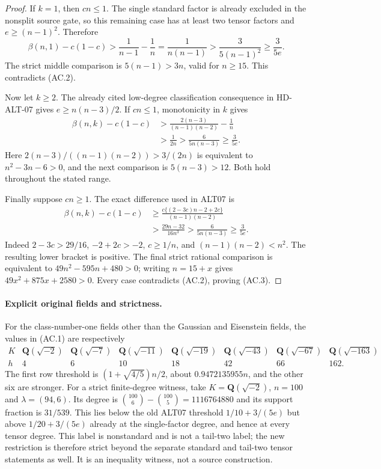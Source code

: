 \begin{proof}
If $k=1$, then $cn\le1$. The single standard factor is already
excluded in the nonsplit source gate, so this remaining case has
at least two tensor factors and $e\ge(n-1)^2$. Therefore
\[
 \beta(n,1)-c(1-c)
 >\frac1{n-1}-\frac1n
 =\frac1{n(n-1)}
 >\frac3{5(n-1)^2}\ge\frac3{5e}.
 \tag{AC.6}
\]
The strict middle comparison is $5(n-1)>3n$, valid for $n\ge15$.
This contradicts (AC.2).

Now let $k\ge2$. The already cited low-degree classification
consequence in HD-ALT-07 gives $e\ge n(n-3)/2$.
If $cn\le1$, monotonicity in $k$ gives
\[
 \begin{split}
 \beta(n,k)-c(1-c)
 &>\frac{2(n-3)}{(n-1)(n-2)}-\frac1n\\
 &>\frac1{2n}>\frac6{5n(n-3)}\ge\frac3{5e}.
 \end{split}
 \tag{AC.7}
\]
Here $2(n-3)/((n-1)(n-2))>3/(2n)$ is equivalent to
$n^2-3n-6>0$, and the next comparison is $5(n-3)>12$.
Both hold throughout the stated range.

Finally suppose $cn\ge1$. The exact difference used in ALT07 is
\[
 \begin{split}
 \beta(n,k)-c(1-c)
 &\ge\frac{c\{(2-3c)n-2+2c\}}{(n-1)(n-2)}\\
 &>\frac{29n-32}{16n^3}
 >\frac6{5n(n-3)}\ge\frac3{5e}.
 \end{split}
 \tag{AC.8}
\]
Indeed $2-3c>29/16$, $-2+2c>-2$, $c\ge1/n$,
and $(n-1)(n-2)<n^2$. The resulting lower bracket is positive.
The final strict rational comparison is equivalent to
$49n^2-595n+480>0$; writing $n=15+x$ gives
$49x^2+875x+2580>0$. Every case contradicts (AC.2), proving (AC.3).
\end{proof}

\paragraph{Explicit original fields and strictness.}
For the class-number-one fields other than the Gaussian and Eisenstein
fields, the values in (AC.1) are respectively
\[
\begin{array}{c|rrrrrrr}
K&\mathbf Q(\sqrt{-2})&\mathbf Q(\sqrt{-7})&
\mathbf Q(\sqrt{-11})&\mathbf Q(\sqrt{-19})&
\mathbf Q(\sqrt{-43})&\mathbf Q(\sqrt{-67})&
\mathbf Q(\sqrt{-163})\\\hline
h&4&6&10&18&42&66&162.
\end{array}
 \tag{AC.9}
\]
The first row threshold is $(1+\sqrt{4/5})n/2$, about
$0.9472135955n$, and the other six are stronger.
For a strict finite-degree witness, take $K=\mathbf Q(\sqrt{-2})$,
$n=100$ and $\lambda=(94,6)$. Its degree is
$\binom{100}{6}-\binom{100}{5}=1116764880$ and its support
fraction is $31/539$. This lies below the old ALT07 threshold
$1/10+3/(5e)$ but above $1/20+3/(5e)$ already at the
single-factor degree, and hence at every tensor degree.
This label is nonstandard and is not a tail-two label; the new
restriction is therefore strict beyond the separate standard and
tail-two tensor statements as well. It is an inequality witness,
not a source construction.

